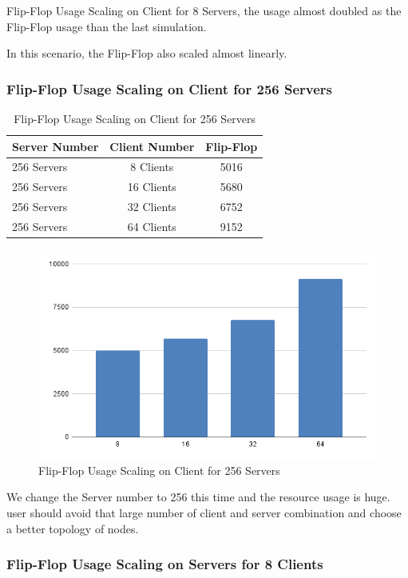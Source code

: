 Flip-Flop Usage Scaling on Client for 8 Servers, the usage almost doubled as the Flip-Flop usage than the last simulation.

In this scenario, the Flip-Flop also scaled almost linearly. 
\newpage
\subsubsection{Flip-Flop Usage Scaling on Client for 256 Servers}

\begin{table}[htb]
	\centering
	\caption{Flip-Flop Usage Scaling on Client for 256 Servers}
	\begin{tabular}{l c c}
		\toprule
		Server Number  & Client Number  & Flip-Flop\\ \midrule
        256	Servers	&	8	Clients	&	5016	\\
        256	Servers	&	16	Clients	&	5680	\\
        256	Servers	&	32	Clients	&	6752	\\
        256	Servers	&	64	Clients	&	9152	\\
		\bottomrule
	\end{tabular}
	\label{tab:FF-256S}
\end{table}

\begin{figure}[h]
	\centering
	\includegraphics[width=.9\linewidth]{figures/Scaling/FF-256S.png}
	\caption{Flip-Flop Usage Scaling on Client for 256 Servers}
	\label{fig:ffs256}
\end{figure}

We change the Server number to 256 this time and the resource usage is huge. user should avoid that large number of client and server combination and choose a better topology of nodes. 
\newpage
\subsubsection{Flip-Flop Usage Scaling on Servers for 8 Clients}

